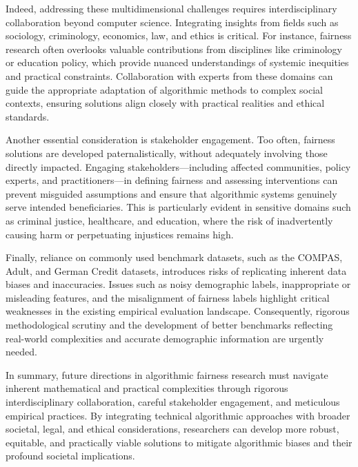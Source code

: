 Indeed, addressing these multidimensional challenges requires
interdisciplinary collaboration beyond computer science. Integrating
insights from fields such as sociology, criminology, economics, law,
and ethics is critical. For instance, fairness research often
overlooks valuable contributions from disciplines like criminology or
education policy, which provide nuanced understandings of systemic
inequities and practical constraints. Collaboration with experts from
these domains can guide the appropriate adaptation of algorithmic
methods to complex social contexts, ensuring solutions align closely
with practical realities and ethical standards.

Another essential consideration is stakeholder engagement. Too often,
fairness solutions are developed paternalistically, without
adequately involving those directly impacted. Engaging
stakeholders—including affected communities, policy experts, and
practitioners—in defining fairness and assessing interventions can
prevent misguided assumptions and ensure that algorithmic systems
genuinely serve intended beneficiaries. This is particularly evident
in sensitive domains such as criminal justice, healthcare, and
education, where the risk of inadvertently causing harm or
perpetuating injustices remains high.

Finally, reliance on commonly used benchmark datasets, such as the
COMPAS, Adult, and German Credit datasets, introduces risks of
replicating inherent data biases and inaccuracies. Issues such as
noisy demographic labels, inappropriate or misleading features, and
the misalignment of fairness labels highlight critical weaknesses in
the existing empirical evaluation landscape. Consequently, rigorous
methodological scrutiny and the development of better benchmarks
reflecting real-world complexities and accurate demographic
information are urgently needed.

In summary, future directions in algorithmic fairness research must
navigate inherent mathematical and practical complexities through
rigorous interdisciplinary collaboration, careful stakeholder
engagement, and meticulous empirical practices. By integrating
technical algorithmic approaches with broader societal, legal, and
ethical considerations, researchers can develop more robust,
equitable, and practically viable solutions to mitigate algorithmic
biases and their profound societal implications.
